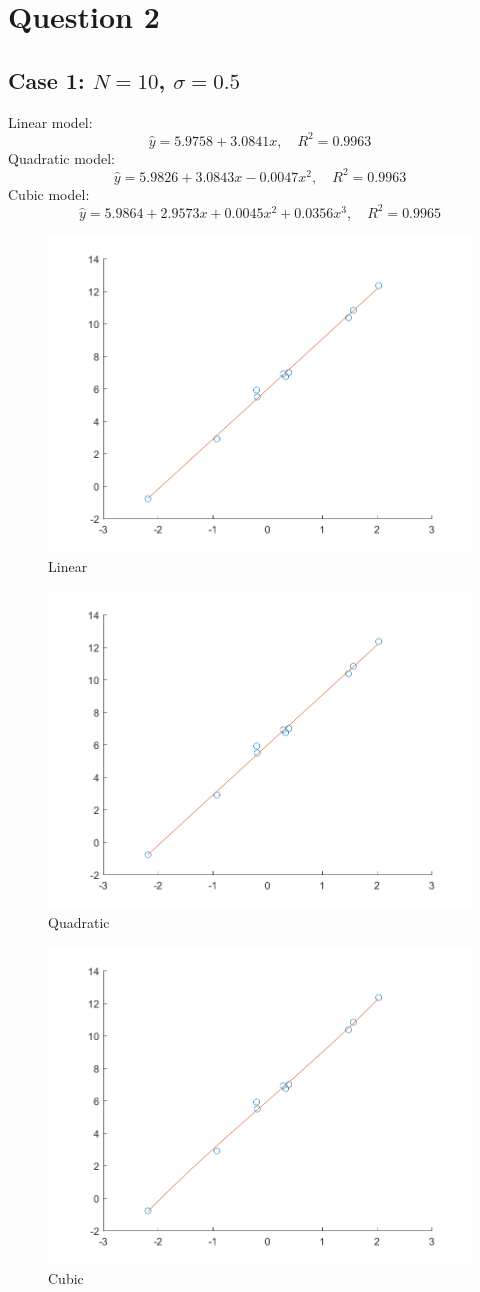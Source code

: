 \documentclass{article}
\begin{document}
\section*{Question 2}
{
    \subsection*{Case 1: $N=10$, $\sigma = 0.5$}
    {
        Linear model: $$\hat{y} = 5.9758 + 3.0841x ,\quad R^2 = 0.9963$$
        Quadratic model: $$\hat{y} = 5.9826 + 3.0843x - 0.0047x^2 ,\quad R^2 = 0.9963$$
        Cubic model: $$\hat{y} = 5.9864 + 2.9573x + 0.0045x^2 + 0.0356x^3 ,\quad R^2 = 0.9965$$

        \begin{figure}[H]
            \centering
            \includegraphics[width = 0.6\linewidth]{2-2-linear-10-0.5.png}
            \caption{Linear}
        \end{figure}

        \begin{figure}[H]
            \centering
            \includegraphics[width = 0.6\linewidth]{2-2-quadratic-10-0.5.png}
            \caption{Quadratic}
        \end{figure}

        \begin{figure}[H]
            \centering
            \includegraphics[width = 0.6\linewidth]{2-2-cubic-10-0.5.png}
            \caption{Cubic}
        \end{figure}

}}
\end{document}
